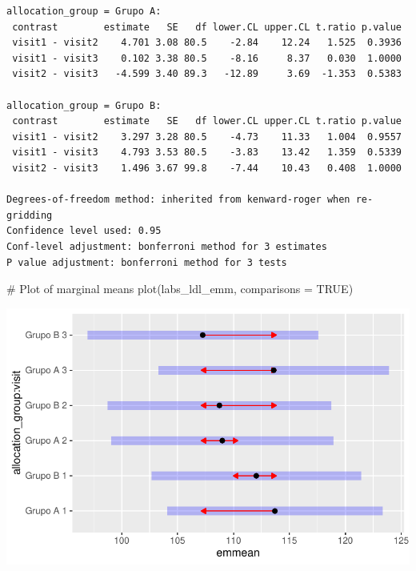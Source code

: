 \documentclass[
  letterpaper,
  DIV=11,
  numbers=noendperiod]{scrartcl}
\newenvironment{Shaded}{\begin{snugshade}}{\end{snugshade}}
\newcommand{\AttributeTok}[1]{\textcolor[rgb]{0.40,0.45,0.13}{#1}}
\newcommand{\CommentTok}[1]{\textcolor[rgb]{0.37,0.37,0.37}{#1}}
\newcommand{\ConstantTok}[1]{\textcolor[rgb]{0.56,0.35,0.01}{#1}}
\newcommand{\FunctionTok}[1]{\textcolor[rgb]{0.28,0.35,0.67}{#1}}
\newcommand{\NormalTok}[1]{\textcolor[rgb]{0.00,0.23,0.31}{#1}}
\begin{document}
\begin{verbatim}
allocation_group = Grupo A:
 contrast        estimate   SE   df lower.CL upper.CL t.ratio p.value
 visit1 - visit2    4.701 3.08 80.5    -2.84    12.24   1.525  0.3936
 visit1 - visit3    0.102 3.38 80.5    -8.16     8.37   0.030  1.0000
 visit2 - visit3   -4.599 3.40 89.3   -12.89     3.69  -1.353  0.5383

allocation_group = Grupo B:
 contrast        estimate   SE   df lower.CL upper.CL t.ratio p.value
 visit1 - visit2    3.297 3.28 80.5    -4.73    11.33   1.004  0.9557
 visit1 - visit3    4.793 3.53 80.5    -3.83    13.42   1.359  0.5339
 visit2 - visit3    1.496 3.67 99.8    -7.44    10.43   0.408  1.0000

Degrees-of-freedom method: inherited from kenward-roger when re-gridding 
Confidence level used: 0.95 
Conf-level adjustment: bonferroni method for 3 estimates 
P value adjustment: bonferroni method for 3 tests 
\end{verbatim}

\begin{Shaded}
\begin{Highlighting}[]
\CommentTok{\# Plot of marginal means}
\FunctionTok{plot}\NormalTok{(labs\_ldl\_emm, }\AttributeTok{comparisons =} \ConstantTok{TRUE}\NormalTok{)}
\end{Highlighting}
\end{Shaded}

\includegraphics{Outcomes_V1V2V3_files/figure-pdf/labs_ldl_sens_emm-1.pdf}
\end{document}
